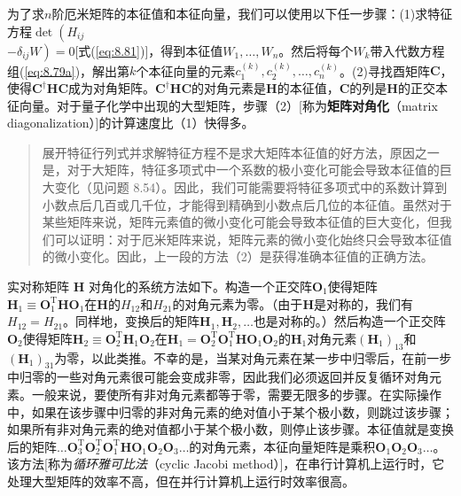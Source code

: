    为了求$n$阶厄米矩阵的本征值和本征向量，我们可以使用以下任一步骤：(1)求特征方程$\det\left(H_{ij}\right.$ \\ $\left. - \delta_{ij}W\right) = 0$[式(\ref{eq:8.81})]，得到本征值$W_1,\ldots,W_n$。然后将每个$W_k$带入代数方程组(\ref{eq:8.79a})，解出第$k$个本征向量的元素$c_1^{\left(k\right)},c_2^{\left(k\right)},\ldots,c_n^{\left(k\right)}$。(2)寻找酉矩阵$\mathbf{C}$，使得$\mathbf{C}^{\dagger}\mathbf{H}\mathbf{C}$成为对角矩阵。$\mathbf{C}^{\dagger}\mathbf{H}\mathbf{C}$的对角元素是$\mathbf{H}$的本征值，$\mathbf{C}$的列是$\mathbf{H}$的正交本征向量。对于量子化学中出现的大型矩阵，步骤（2）[称为\textbf{矩阵对角化}（matrix diagonalization）]的计算速度比（1）快得多。
    \begin{quote}
        \small
        \noindent 展开特征行列式并求解特征方程不是求大矩阵本征值的好方法，原因之一是，对于大矩阵，特征多项式中一个系数的极小变化可能会导致本征值的巨大变化（见问题 8.54）。因此，我们可能需要将特征多项式中的系数计算到小数点后几百或几千位，才能得到精确到小数点后几位的本征值。虽然对于某些矩阵来说，矩阵元素值的微小变化可能会导致本征值的巨大变化，但我们可以证明：对于厄米矩阵来说，矩阵元素的微小变化始终只会导致本征值的微小变化。因此，上一段的方法（2）是获得准确本征值的正确方法。
    \end{quote}

    实对称矩阵 $\mathbf{H}$ 对角化的系统方法如下。构造一个正交阵$\mathbf{O}_1$使得矩阵$\mathbf{H}_1 \equiv \mathbf{O}_1^{\mathrm{T}}\mathbf{H}\mathbf{O}_1$在$\mathbf{H}$的$H_{12}$和$H_{21}$的对角元素为零。（由于$\mathbf{H}$是对称的，我们有$H_{12} = H_{21}$。同样地，变换后的矩阵$\mathbf{H}_1, \mathbf{H}_2 ,\ldots$也是对称的。）然后构造一个正交阵$\mathbf{O}_2$使得矩阵$\mathbf{H}_2 \equiv \mathbf{O}_2^{\mathrm{T}}\mathbf{H}_1\mathbf{O}_2$在$\mathbf{H}_1 = \mathbf{O}_2^{\mathrm{T}}\mathbf{O}_1^{\mathrm{T}}\mathbf{H}\mathbf{O}_1\mathbf{O}_2$的$\mathbf{H}_1$对角元素$\left(\mathbf{H}_1\right)_{13}$和$\left(\mathbf{H}_1\right)_{31}$为零，以此类推。不幸的是，当某对角元素在某一步中归零后，在前一步中归零的一些对角元素很可能会变成非零，因此我们必须返回并反复循环对角元素。一般来说，要使所有非对角元素都等于零，需要无限多的步骤。在实际操作中，如果在该步骤中归零的非对角元素的绝对值小于某个极小数，则跳过该步骤；如果所有非对角元素的绝对值都小于某个极小数，则停止该步骤。本征值就是变换后的矩阵$\ldots \mathbf{O}_3^{\mathrm{T}}\mathbf{O}_2^{\mathrm{T}}\mathbf{O}_1^{\mathrm{T}}\mathbf{H}\mathbf{O}_1\mathbf{O}_2\mathbf{O}_3\ldots$的对角元素，本征向量矩阵是乘积$\mathbf{O}_1\mathbf{O}_2\mathbf{O}_3\ldots$。该方法[称为\textit{循环雅可比法}（cyclic Jacobi method）]，在串行计算机上运行时，它处理大型矩阵的效率不高，但在并行计算机上运行时效率很高。

